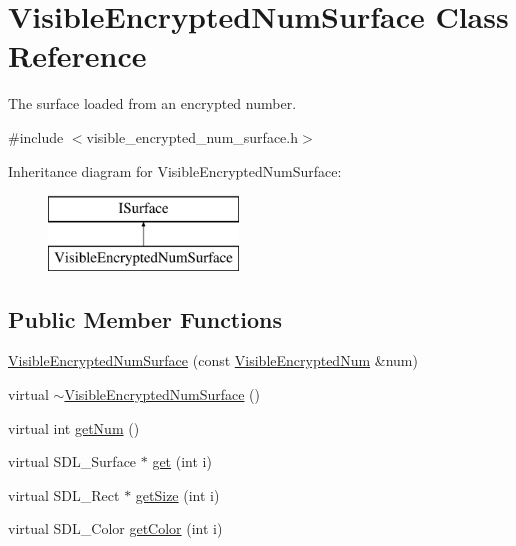 \hypertarget{class_visible_encrypted_num_surface}{}\section{Visible\+Encrypted\+Num\+Surface Class Reference}
\label{class_visible_encrypted_num_surface}


The surface loaded from an encrypted number.  




{\ttfamily \#include $<$visible\+\_\+encrypted\+\_\+num\+\_\+surface.\+h$>$}

Inheritance diagram for Visible\+Encrypted\+Num\+Surface\+:\begin{figure}[H]
\begin{center}
\leavevmode
\includegraphics[height=2.000000cm]{class_visible_encrypted_num_surface}
\end{center}
\end{figure}
\subsection*{Public Member Functions}
\begin{DoxyCompactItemize}
\item 
\mbox{\hyperlink{class_visible_encrypted_num_surface_aaee46834915f1c0463eac6e8a6f50369}{Visible\+Encrypted\+Num\+Surface}} (const \mbox{\hyperlink{class_visible_encrypted_num}{Visible\+Encrypted\+Num}} \&num)
\item 
virtual \mbox{\hyperlink{class_visible_encrypted_num_surface_affe295bd756072b3b8664f763d5ab2ab}{$\sim$\+Visible\+Encrypted\+Num\+Surface}} ()
\item 
virtual int \mbox{\hyperlink{class_visible_encrypted_num_surface_a2f375428e6bcf6f442a4fa26ffdaccf8}{get\+Num}} ()
\item 
virtual S\+D\+L\+\_\+\+Surface $\ast$ \mbox{\hyperlink{class_visible_encrypted_num_surface_a36866f967b78c3fadd234ee4ec0c9195}{get}} (int i)
\item 
virtual S\+D\+L\+\_\+\+Rect $\ast$ \mbox{\hyperlink{class_visible_encrypted_num_surface_a1630bfa672150174ab134821f50f9ee5}{get\+Size}} (int i)
\item 
virtual S\+D\+L\+\_\+\+Color \mbox{\hyperlink{class_visible_encrypted_num_surface_a8c8d92c6bbbcc2e4f8a471449b9b54fa}{get\+Color}} (int i)
\end{DoxyCompactItemize}


